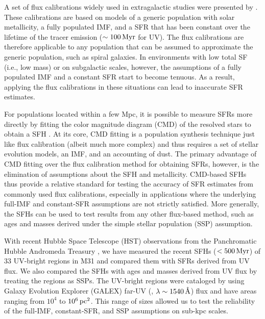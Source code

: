 A set of flux calibrations widely used in extragalactic studies were presented
by \citet[][see \citealp{Kennicutt:2012} for updates]{Kennicutt:1998}. These
calibrations are based on models of a generic population with solar
metallicity, a fully populated IMF, and a SFR that has been constant over the
lifetime of the tracer emission ($\sim 100\,\mathrm{Myr}$ for UV). The flux calibrations
are therefore applicable to any population that can be assumed to approximate
the generic population, such as spiral galaxies. In environments with low total
SF (i.e., low mass) or on subgalactic scales, however, the assumptions of a
fully populated IMF and a constant SFR start to become tenuous. As a result,
applying the flux calibrations in these situations can lead to inaccurate SFR
estimates.

For populations located within a few Mpc, it is possible to measure SFRs more
directly by fitting the color magnitude diagram (CMD) of the resolved stars to
obtain a SFH \citep{Dolphin:2002}. At its core, CMD fitting is a population
synthesis technique just like flux calibration (albeit much more complex) and
thus requires a set of stellar evolution models, an IMF, and an accounting of
dust. The primary advantage of CMD fitting over the flux calibration method for
obtaining SFRs, however, is the elimination of assumptions about the SFH and
metallicity. CMD-based SFHs thus provide a relative standard for testing the
accuracy of SFR estimates from commonly used flux calibrations, especially in
applications where the underlying full-IMF and constant-SFR assumptions are not
strictly satisfied. More generally, the SFHs can be used to test results from
any other flux-based method, such as ages and masses derived under the simple
stellar population (SSP) assumption.

With recent Hubble Space Telescope (HST) observations from the Panchromatic
Hubble Andromeda Treasury \citep[PHAT;][]{Dalcanton:2012}, we have measured the
recent SFHs ($< 500\,\mathrm{Myr}$) of 33 UV-bright regions in M31 and compared
them with SFRs derived from UV flux. We also compared the SFHs with ages and
masses derived from UV flux by treating the regions as SSPs. The UV-bright
regions were cataloged by \citet[][ hereafter]{Kang:2009} using
Galaxy Evolution Explorer (GALEX) far-UV (\fuv{}, $\lambda \sim
1540\,\textrm{\AA}$) flux and have areas ranging from $10^4$ to
$10^6\,\mathrm{pc}^2$. This range of sizes allowed us to test the reliability
of the full-IMF, constant-SFR, and SSP assumptions on sub-kpc scales.




